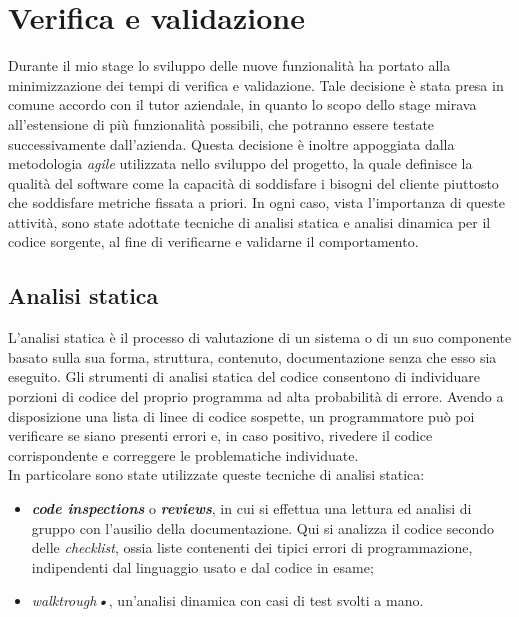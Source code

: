 
\chapter{Verifica e validazione}
\label{cap:verifica}

Durante il mio stage lo sviluppo delle nuove funzionalità ha portato alla minimizzazione dei tempi di verifica e validazione. Tale decisione è stata presa in comune accordo con il tutor aziendale, in quanto lo scopo dello stage mirava all’estensione di più funzionalità possibili, che potranno essere testate successivamente dall’azienda.
Questa decisione è inoltre appoggiata dalla metodologia \emph{agile} utilizzata nello sviluppo del progetto, la quale definisce la qualità del software come la capacità di soddisfare i bisogni del cliente piuttosto che soddisfare metriche fissata a priori.
In ogni caso, vista l'importanza di queste attività, sono state adottate tecniche di analisi statica e analisi dinamica per il codice sorgente, al fine di verificarne e validarne il comportamento.

\section{Analisi statica}
L’analisi statica è il processo di valutazione di un sistema o di un suo componente basato sulla sua forma, struttura, contenuto, documentazione senza che esso sia eseguito. Gli strumenti di analisi statica del codice consentono di individuare porzioni di codice del proprio programma ad alta probabilità di errore. Avendo a disposizione una lista di linee di codice sospette, un programmatore può poi verificare se siano presenti errori e, in caso positivo, rivedere il codice corrispondente e correggere le problematiche individuate. \\
In particolare sono state utilizzate queste tecniche di analisi statica:
\begin{itemize}
	\item \textbf{\emph{code inspections}} o \textbf{\emph{reviews}}, in cui si effettua una lettura ed analisi di gruppo
con l’ausilio della documentazione. Qui si analizza il codice secondo delle \emph{checklist}, ossia liste contenenti dei tipici errori di programmazione, indipendenti dal linguaggio usato e dal codice in esame;	
	\item \emph{walktrough\textbf{•}}, un’analisi dinamica con casi di test svolti a mano.
\end{itemize}

